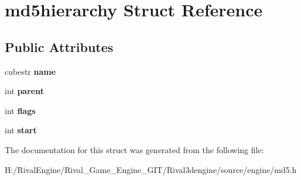\hypertarget{structmd5hierarchy}{}\section{md5hierarchy Struct Reference}
\label{structmd5hierarchy}
\subsection*{Public Attributes}
\begin{DoxyCompactItemize}
\item 
\mbox{\label{structmd5hierarchy_ac613a3c75dbc4105a80644df2a31c93d}} 
cubestr {\bfseries name}
\item 
\mbox{\label{structmd5hierarchy_a60f874dbd7e31320635ee3fe1e9151b2}} 
int {\bfseries parent}
\item 
\mbox{\label{structmd5hierarchy_a3bf28f84a87a694dfdc694e123dfa617}} 
int {\bfseries flags}
\item 
\mbox{\label{structmd5hierarchy_a19064d793eccc3df64830cbad985229d}} 
int {\bfseries start}
\end{DoxyCompactItemize}


The documentation for this struct was generated from the following file\+:\begin{DoxyCompactItemize}
\item 
H\+:/\+Rival\+Engine/\+Rival\+\_\+\+Game\+\_\+\+Engine\+\_\+\+G\+I\+T/\+Rival3dengine/source/engine/md5.\+h\end{DoxyCompactItemize}
